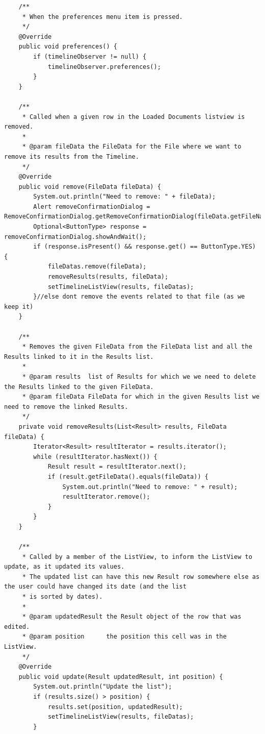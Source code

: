 \begin{lstlisting}
    /**
     * When the preferences menu item is pressed.
     */
    @Override
    public void preferences() {
        if (timelineObserver != null) {
            timelineObserver.preferences();
        }
    }

    /**
     * Called when a given row in the Loaded Documents listview is removed.
     *
     * @param fileData the FileData for the File where we want to remove its results from the Timeline.
     */
    @Override
    public void remove(FileData fileData) {
        System.out.println("Need to remove: " + fileData);
        Alert removeConfirmationDialog = RemoveConfirmationDialog.getRemoveConfirmationDialog(fileData.getFileName());
        Optional<ButtonType> response = removeConfirmationDialog.showAndWait();
        if (response.isPresent() && response.get() == ButtonType.YES) {
            fileDatas.remove(fileData);
            removeResults(results, fileData);
            setTimelineListView(results, fileDatas);
        }//else dont remove the events related to that file (as we keep it)
    }

    /**
     * Removes the given FileData from the FileData list and all the Results linked to it in the Results list.
     *
     * @param results  list of Results for which we we need to delete the Results linked to the given FileData.
     * @param fileData FileData for which in the given Results list we need to remove the linked Results.
     */
    private void removeResults(List<Result> results, FileData fileData) {
        Iterator<Result> resultIterator = results.iterator();
        while (resultIterator.hasNext()) {
            Result result = resultIterator.next();
            if (result.getFileData().equals(fileData)) {
                System.out.println("Need to remove: " + result);
                resultIterator.remove();
            }
        }
    }

    /**
     * Called by a member of the ListView, to inform the ListView to update, as it updated its values.
     * The updated list can have this new Result row somewhere else as the user could have changed its date (and the list
     * is sorted by dates).
     *
     * @param updatedResult the Result object of the row that was edited.
     * @param position      the position this cell was in the ListView.
     */
    @Override
    public void update(Result updatedResult, int position) {
        System.out.println("Update the list");
        if (results.size() > position) {
            results.set(position, updatedResult);
            setTimelineListView(results, fileDatas);
        }


\end{lstlisting}
